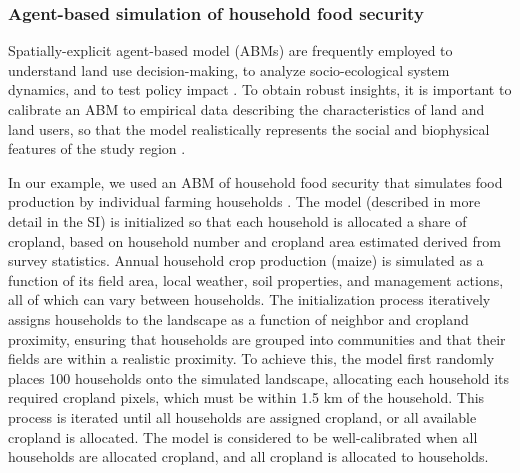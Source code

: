 \documentclass[12 pt, titlepage, a4paper]{article}
\begin{document}
\vspace{-0.3 cm}
\subsubsection*{Agent-based simulation of household food security }
\vspace{-0.2 cm}
Spatially-explicit agent-based model (ABMs) are frequently employed to understand land use decision-making, to analyze socio-ecological system dynamics, and to test policy impact \citep{berger_creating_2006}. To obtain robust insights, it is important to calibrate an ABM to empirical data describing the characteristics of land and land users, so that the model realistically represents the social and biophysical features of the study region \citep{berger_creating_2006}. 

In our example, we used an ABM of household food security that simulates food production by individual farming households \citep[the agents; ][]{chen_dependency_2013}. The model (described in more detail in the SI) is initialized so that each household is allocated a share of cropland, based on household number and cropland area estimated derived from survey statistics. Annual household crop production (maize) is simulated as a function of its field area, local weather, soil properties, and management actions, all of which can vary between households. The initialization process iteratively assigns households to the landscape as a function of neighbor and cropland proximity, ensuring that households are grouped into communities and that their fields are within a realistic proximity. To achieve this, the model first randomly places 100 households onto the simulated landscape, allocating each household its required cropland pixels, which must be within 1.5 km of the household. This process is iterated until all households are assigned cropland, or all available cropland is allocated. The model is considered to be well-calibrated when all households are allocated cropland, and all cropland is allocated to households. 
\end{document}
